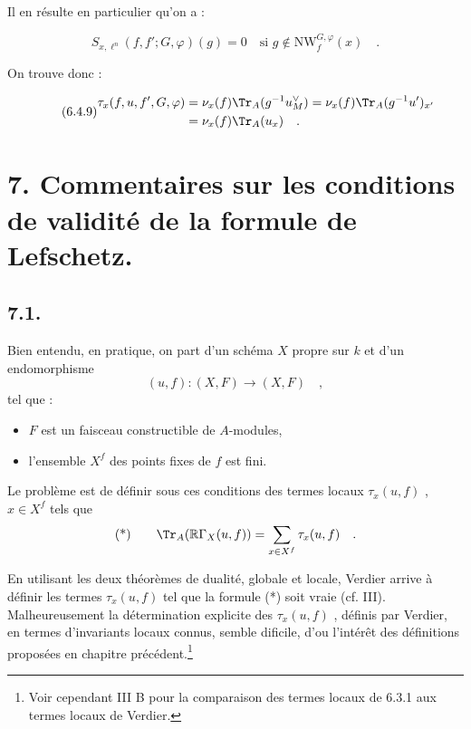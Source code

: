 Il en résulte en particulier qu'on a :

\begin{equation}\tag{6.4.8}
S_{x,\ell^n}(f, f'; G, \varphi)(g) = 0 \quad \text{si } g \notin \mathrm{NW}_{f}^{G,\varphi}(x) \quad .
\end{equation}

On trouve donc :

\begin{equation}\tag{6.4.9}
\begin{aligned}
\tau_x(f,u, f', G, \varphi) &= \nu_x(f) \Tr_A(g^{-1}u_M^\vee) = \nu_x(f) \Tr_A(g^{-1}u')_{x'} \\
&= \nu_x(f) \Tr_A(u_x) \quad .
\end{aligned}
\end{equation}

\section*{7. Commentaires sur les conditions de validité de la formule de Lefschetz.}

\subsection*{7.1.}
Bien entendu, en pratique, on part d'un schéma $X$ propre sur $k$ et d'un endomorphisme
\[
(u, f) : (X, F) \longrightarrow (X, F) \quad ,
\]
tel que :
\begin{itemize}[label=-]
\item $F$ est un faisceau constructible de $A$-modules,
\item l'ensemble $X^f$ des points fixes de $f$ est fini.
\end{itemize}

Le problème est de définir sous ces conditions des termes locaux $\tau_x(u, f)$ , $x \in X^f$ tels que
\[
\text{(*)} \qquad \Tr_A(\mathbb{R}\Gamma_X(u, f)) = \sum_{x \in X^f} \tau_x(u, f) \quad .
\]

En utilisant les deux théorèmes de dualité, globale et locale, Verdier arrive à définir les termes $\tau_x(u, f)$ tel que la formule (*) soit vraie (cf. III). Malheureusement la détermination explicite des $\tau_x(u, f)$ , définis par Verdier, en termes d'invariants locaux connus, semble dificile, d'ou l'intérêt des définitions proposées en chapitre précédent.\footnote{Voir cependant III B pour la comparaison des termes locaux de 6.3.1 aux termes locaux de Verdier.}

